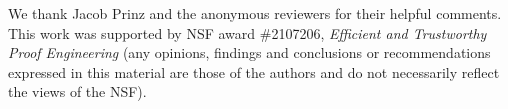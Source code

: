 \documentclass[sigplan,screen]{acmart}
\begin{document}


\maketitle







\begin{acks}
  We thank Jacob Prinz and the anonymous reviewers for their helpful
  comments.  This work was supported by NSF award \#2107206, {\em
    Efficient and Trustworthy Proof Engineering} (any opinions,
  findings and conclusions or recommendations expressed in this
  material are those of the authors and do not necessarily reflect the
  views of the NSF).
\end{acks}





\end{document}
